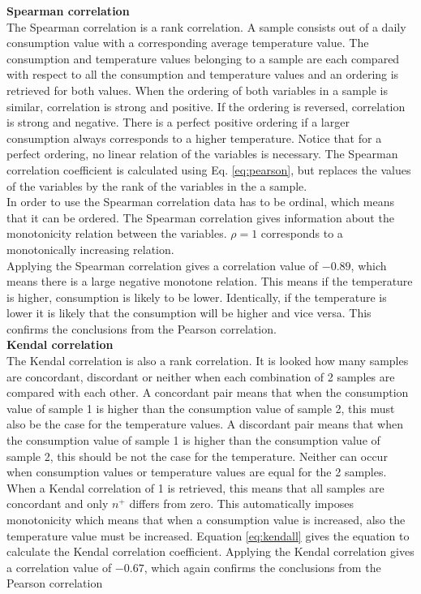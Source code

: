 \textbf{Spearman correlation}\\
The Spearman correlation is a rank correlation. A sample consists out of a daily consumption value with a corresponding average temperature value.
The consumption and temperature values belonging to a sample are each compared with respect to all the consumption and temperature values and an ordering is retrieved for both values. When the ordering of both variables in a sample is similar, correlation is strong and positive. If the ordering is reversed, correlation is strong and negative. There is a perfect positive ordering if a larger consumption always corresponds to a higher temperature. Notice that for a perfect ordering, no linear relation of the variables is necessary. The Spearman correlation coefficient is calculated using Eq. \ref{eq:pearson}, but replaces the values of the variables by the rank of the variables in the a sample.\\

In order to use the Spearman correlation data has to be ordinal, which means that it can be ordered. The Spearman correlation gives information about the monotonicity relation between the variables. $ \rho = 1 $ corresponds to a monotonically increasing relation.\\

Applying the Spearman correlation  gives a correlation value of $ -0.89$, which means there is a large negative monotone relation. This means if the temperature is higher, consumption is likely to be lower. Identically, if the temperature is lower it is likely that the consumption will be higher and vice versa. This confirms the conclusions from the Pearson correlation.\\

\textbf{Kendal correlation}\\
The Kendal correlation is also a rank correlation. It is looked how many samples are concordant, discordant or neither when each combination of 2 samples are compared with each other. A concordant pair means that when the consumption value of sample 1 is higher than the consumption value of sample 2, this must also be the case for the temperature values. A discordant pair means that when the consumption value of sample 1 is higher than the consumption value of sample 2, this should be not the case for the temperature. Neither can occur when consumption values or temperature values are equal for the 2 samples. When a Kendal correlation of 1 is retrieved, this means that all samples are concordant and only $ n^+ $ differs from zero. This automatically imposes monotonicity which means that when a consumption value is increased, also the temperature value must be increased. Equation \ref{eq:kendall} gives the equation to calculate the Kendal correlation coefficient. Applying the Kendal correlation  gives a correlation value of $ -0.67$, which again confirms the conclusions from the Pearson correlation\\

